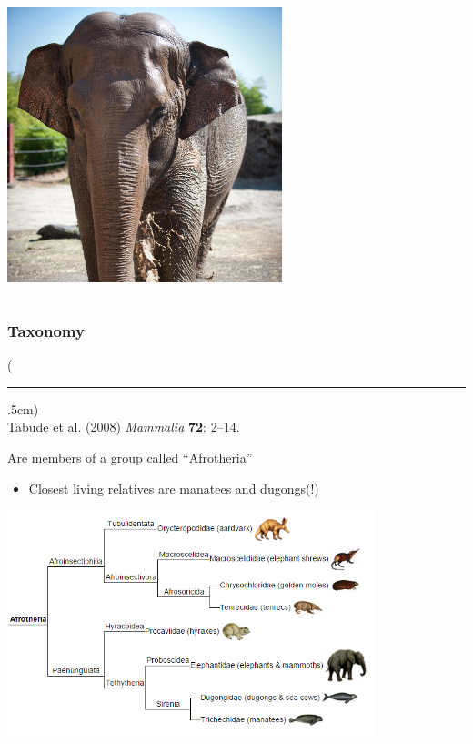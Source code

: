 \documentclass[10pt]{beamer}
\newenvironment{reference}[2]{%
	\begin{textblock*}{\textwidth}(#1,#2)
		\tiny\bgroup\color{gray}}{\egroup\end{textblock*}}
\begin{document}
\begin{frame}[t]
\begin{columns}[t]
\begin{column}{0.5\textwidth}
			\vspace{0.25cm}
			
			\begin{center}
				\includegraphics[width=0.6\textwidth]{figures/asian.png}
			\end{center}
		\end{column}
	\end{columns}

\end{frame}  


\begin{frame}[t]
\frametitle{Taxonomy}
\vspace{0.25cm}

	\begin{reference}{4mm}{92mm}
		\rule{1.5cm}{0.25pt}\\
		Tabude et al. (2008) \emph{Mammalia} \textbf{72}: 2--14.
	\end{reference}
	
	Are members of a group called ``Afrotheria''
		\begin{itemize}
			\item Closest living relatives are manatees and dugongs(!)
		\end{itemize}
	
	\vspace{0.5cm}
	
	\begin{center}
		\includegraphics[width=0.8\textwidth]{figures/afrotheria.png}
	\end{center}
\end{frame}   
\end{document}
